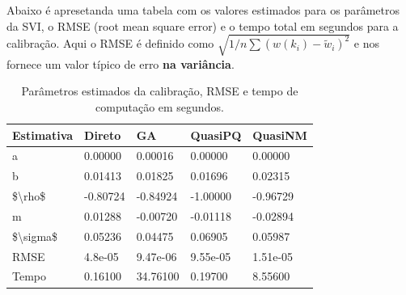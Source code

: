 \documentclass[]{book}
\newenvironment{Shaded}{\begin{snugshade}}{\end{snugshade}}
\newcommand{\KeywordTok}[1]{\textcolor[rgb]{0.13,0.29,0.53}{\textbf{#1}}}
\newcommand{\DataTypeTok}[1]{\textcolor[rgb]{0.13,0.29,0.53}{#1}}
\newcommand{\DecValTok}[1]{\textcolor[rgb]{0.00,0.00,0.81}{#1}}
\newcommand{\StringTok}[1]{\textcolor[rgb]{0.31,0.60,0.02}{#1}}
\newcommand{\OtherTok}[1]{\textcolor[rgb]{0.56,0.35,0.01}{#1}}
\newcommand{\OperatorTok}[1]{\textcolor[rgb]{0.81,0.36,0.00}{\textbf{#1}}}
\newcommand{\NormalTok}[1]{#1}
\theoremstyle{definition}
\theoremstyle{definition}
\theoremstyle{definition}
\theoremstyle{remark}
\begin{document}
Abaixo é apresetanda uma tabela com os valores estimados para os
parâmetros da SVI, o RMSE (root mean square error) e o tempo total em
segundos para a calibração. Aqui o RMSE é definido como
\(\sqrt{1/n\sum(w(k_i)-\tilde w_i)^2}\) e nos fornece um valor típico de
erro \textbf{na variância}.

\begin{Shaded}
\end{Shaded}

\begin{table}[t]

\caption{\label{tab:tabela}Parâmetros estimados da calibração, RMSE e tempo de computação em segundos.}
\centering
\fontsize{18}{20}\selectfont
\begin{tabular}{lllll}
\toprule
Estimativa & Direto & GA & QuasiPQ & QuasiNM\\
\midrule
a & 0.00000 & 0.00016 & 0.00000 & 0.00000\\
b & 0.01413 & 0.01825 & 0.01696 & 0.02315\\
\$\textbackslash{}rho\$ & -0.80724 & -0.84924 & -1.00000 & -0.96729\\
m & 0.01288 & -0.00720 & -0.01118 & -0.02894\\
\$\textbackslash{}sigma\$ & 0.05236 & 0.04475 & 0.06905 & 0.05987\\
\addlinespace
RMSE & 4.8e-05 & 9.47e-06 & 9.55e-05 & 1.51e-05\\
Tempo & 0.16100 & 34.76100 & 0.19700 & 8.55600\\
\bottomrule
\end{tabular}
\end{table}
\end{document}
